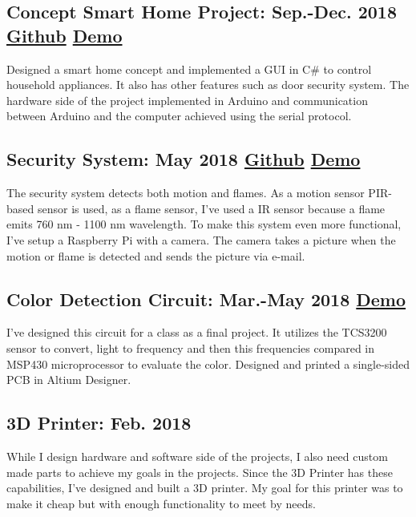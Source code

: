 \documentclass[10pt]{article}
\begin{document}
\subsection{Concept Smart Home Project: Sep.-Dec. 2018 \textcolor{Mycolor3}{\href{https://github.com/Zrrck/Like-a-Smart-Home-but-Not}{\small{Github}}}
\textcolor{Mycolor2}{\href{https://youtu.be/kD4CY6Yt-gg}{\small{Demo}}}}
Designed a smart home concept and implemented a GUI in C\# to control household appliances. It also has other features such as door security system. The hardware side of the project implemented in Arduino and communication between Arduino and the computer achieved using the serial protocol.


\subsection{Security System: May 2018 \textcolor{Mycolor3}{\href{https://github.com/Zrrck/Raspberry-Pi-Fire-Security-System}{\small{Github}}}
\textcolor{Mycolor2}{\href{https://youtu.be/s6VeqZgOBLw}{\small{Demo}}}}
The security system detects both motion and flames. As a motion sensor PIR-based sensor is used, 
as a flame sensor, I've used a IR sensor because a flame emits 760 nm - 1100 nm wavelength. To make this system even more functional, I've setup a Raspberry Pi with a camera. The camera takes a picture when the motion or flame is detected and sends the picture via e-mail.  

\subsection{Color Detection Circuit: Mar.-May 2018 \textcolor{Mycolor3}{\href{https://github.com/Zrrck/Color-Detection-using-TCS3200}{}}
\textcolor{Mycolor2}{\href{https://youtu.be/NfwZGEqTPVs}{\small{Demo}}}}
I've designed this circuit for a class as a final project. It utilizes the TCS3200 sensor to convert, light to frequency and then this frequencies compared in MSP430 microprocessor to evaluate the color. Designed and printed a single-sided PCB in Altium Designer.

\subsection{3D Printer: Feb. 2018} 
While I design hardware and software side of the projects, I also need custom made parts to achieve my goals in the projects. Since the 3D Printer has these capabilities, I've designed and built a 3D printer. My goal for this printer was to make it cheap but with enough functionality to meet by needs.
\end{document}

